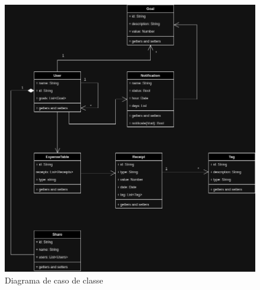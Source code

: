 \begin{figure}[h!]
    \centering
    \caption{Diagrama de caso de classe}
    \includegraphics[scale=0.4]{images/money-tracker-Class-Diagram.png}
\end{figure}